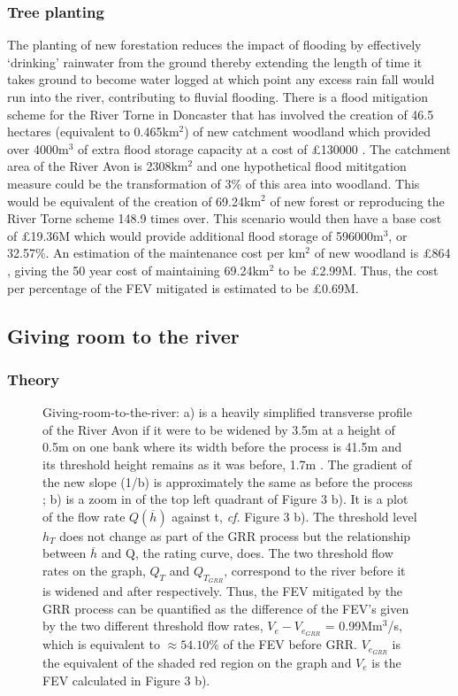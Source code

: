 \documentclass[11pt,a4paper]{article}
\begin{document}
\subsubsection{Tree planting}
The planting of new forestation reduces the impact of flooding by effectively `drinking' rainwater from the ground thereby extending the length of time it takes ground to become water logged at which point any excess rain fall would run into the river, contributing to fluvial flooding. There is a flood mitigation scheme for the River Torne in Doncaster that has involved the creation of 46.5 hectares (equivalent to 0.465km$^2$) of new catchment woodland which provided over 4000m$^3$ of extra flood storage capacity at a cost of \pounds130000 \cite{nfm}. The catchment area of the River Avon is 2308km$^2$ \cite{britannica} and one hypothetical flood mititgation measure could be the transformation of 3\% of this area into woodland. This would be equivalent of the creation of 69.24km$^2$ of new forest or reproducing the River Torne scheme 148.9 times over. This scenario would then have a base cost of \pounds19.36M which would provide additional flood storage of 596000m$^3$, or 32.57\%. An estimation of the maintenance cost per km$^2$ of new woodland is \pounds864 \cite{cost1}, giving the 50 year cost of maintaining 69.24km$^2$ to be \pounds2.99M. Thus, the cost per percentage of the FEV mitigated is estimated to be \pounds0.69M.

\subsection{Giving room to the river}
\subsubsection{Theory}
\begin{figure}[ht!]
\begin{center}
\hfill
{}
\caption{Giving-room-to-the-river: a) is a heavily simplified transverse profile of the River Avon if it were to be widened by 3.5m at a height of 0.5m on one bank where its width before the process is 41.5m and its threshold height remains as it was before, 1.7m \cite{maps}. The gradient of the new slope (1/b) is approximately the same as before the process {;} b) is a zoom in of the top left quadrant of Figure 3 b). It is a plot of the flow rate $Q(\overline{h})$ against t, \textit{cf.} Figure 3 b). The threshold level $h_T$ does not change as part of the GRR process but the relationship between $\overline{h}$ and Q, the rating curve, does. The two threshold flow rates on the graph, $Q_{T}$ and $Q_{T_{GRR}}$, correspond to the river before it is widened and after respectively. Thus, the FEV mitigated by the GRR process can be quantified as the difference of the FEV's given by the two different threshold flow rates, $V_{e}-V_{e_{GRR}}$ = 0.99Mm$^3$/s, which is equivalent to $\approx 54.10\%$ of the FEV before GRR. $V_{e_{GRR}}$ is the equivalent of the shaded red region on the graph and $V_{e}$ is the FEV calculated in Figure 3 b).}
\end{center}
\end{figure}
\end{document}
